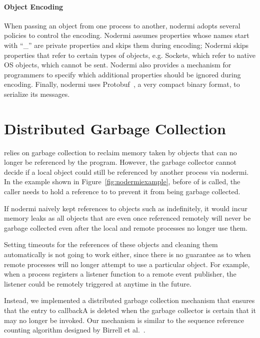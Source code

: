 \paragraph{Object Encoding}
When passing an object from one process to another,
nodermi adopts several policies to control the encoding.
Nodermi assumes properties whose names start with ``\_'' are
private properties and skips them during encoding;
Nodermi skips properties that refer to certain types of objects, e.g. Sockets,
which refer to native OS objects, which cannot be sent.
Nodermi also provides a mechanism for programmers to specify which
additional properties should be ignored during encoding.
Finally, nodermi uses Protobuf~\cite{protobuf}, a very compact
binary format, to serialize its messages.


\section{Distributed Garbage Collection}
\js{} relies on garbage collection to reclaim memory taken by
objects that can no longer be referenced by the program.
However, the garbage collector cannot decide if a local object
could still be referenced by another process via nodermi.
In the example shown in Figure~\ref{fig:nodermiexample},
before  of  is called,
the caller needs to hold a reference to 
to prevent it from being garbage collected.

If nodermi naively kept references to objects such as
 indefinitely, it would incur memory leaks as all
objects that are even once referenced remotely will never be garbage
collected even after the local and remote processes no longer use them.

Setting timeouts for the references of these objects and cleaning
them automatically is not going to work either,
since there is no guarantee as to when remote processes will
no longer attempt to use a particular object.
For example, when a process registers a listener function to a remote event publisher,
the listener could be remotely triggered at anytime in the future.

Instead, we implemented a distributed garbage collection mechanism
that ensures that the entry to callbackA is deleted when the
garbage collector is certain that it may no longer be invoked.
Our mechanism is similar to the sequence reference counting algorithm
designed by Birrell et al.~\cite{birrell1993distributed}.


